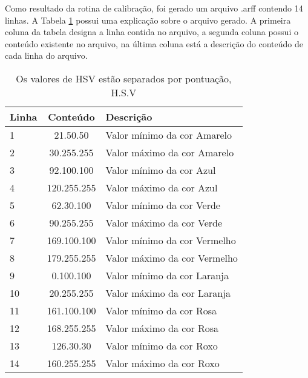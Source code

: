 Como resultado da rotina de calibração, foi gerado um arquivo .arff contendo 14 linhas. A Tabela \ref{tab:arquivo} possui uma explicação sobre o arquivo gerado. A primeira coluna da tabela designa a linha contida no arquivo, a segunda coluna possui o conteúdo existente no arquivo, na última coluna está a descrição do conteúdo de cada linha do arquivo.
	\begin{table}[H]
\centering 
\begin{tabular}{l|c|l}
Linha & Conteúdo & Descrição  \\%
\hline                               %
 1& 21.50.50  &   Valor mínimo da cor Amarelo \\ \hline  
2& 30.255.255  &  Valor máximo da cor Amarelo \\  \hline 
3& 92.100.100  &   Valor mínimo da cor Azul \\  \hline 
4& 120.255.255  &  Valor máximo da cor  Azul \\  \hline 
5& 62.30.100 &  Valor mínimo da cor Verde \\  \hline 
6& 90.255.255  &  Valor máximo da cor Verde \\  \hline 
7& 169.100.100  &  Valor mínimo da cor Vermelho \\  \hline 
8& 179.255.255  &  Valor máximo da cor Vermelho \\   \hline 
9& 0.100.100  &  Valor mínimo da cor Laranja \\  \hline 
10& 20.255.255 &  Valor máximo da cor  Laranja \\  \hline 
11& 161.100.100 &  Valor mínimo da cor Rosa \\  \hline 
12& 168.255.255 &   Valor máximo da cor Rosa \\  \hline 
13& 126.30.30 &  Valor mínimo da cor Roxo \\  \hline 
14& 160.255.255 &  Valor máximo da cor Roxo \\  \hline 

\end{tabular}
\caption{Os valores de HSV estão separados por pontuação, H.S.V}
\label{tab:arquivo}
\end{table}






